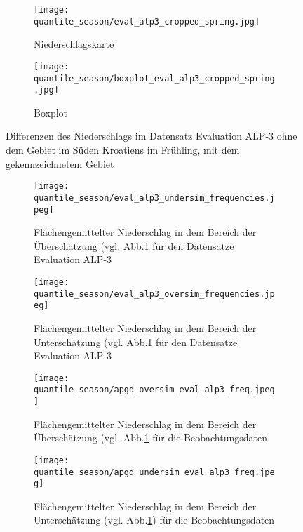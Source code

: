 \begin{figure}[h!]
	\begin{subfigure}{0.49\textwidth}
		\texttt{[image: quantile\_season/eval\_alp3\_cropped\_spring.jpg]}
		\caption{Niederschlagskarte}
		\label{fig:seasons:cropped eval_alp_3}
	\end{subfigure}
	\begin{subfigure}{0.49\textwidth}
		\texttt{[image: quantile\_season/boxplot\_eval\_alp3\_cropped\_spring.jpg]}
		\caption{Boxplot}
		\label{fig:seasons:cropped eval_alp_3_boxplot}
	\end{subfigure}
	\caption{Differenzen des Niederschlags im Datensatz Evaluation ALP-3 ohne dem Gebiet im Süden Kroatiens im Frühling, mit dem gekennzeichnetem Gebiet}
\end{figure}

\begin{figure}[h!]
	\begin{subfigure}{0.49\textwidth}
		\texttt{[image: quantile\_season/eval\_alp3\_undersim\_frequencies.jpeg]}
		\caption{Flächengemittelter Niederschlag in dem Bereich der Überschätzung (vgl. Abb.\ref{fig:seasons:cropped eval_alp_3} für den Datensatze Evaluation ALP-3}
		\label{fig:seasons:oversim eval_alp_3}
	\end{subfigure}
	\begin{subfigure}{0.49\textwidth}
		\texttt{[image: quantile\_season/eval\_alp3\_oversim\_frequencies.jpeg]}
		\caption{Flächengemittelter Niederschlag in dem Bereich der Unterschätzung (vgl. Abb.\ref{fig:seasons:cropped eval_alp_3} für den Datensatze Evaluation ALP-3}
		\label{fig:seasons:undersim_eval_alp_3}
	\end{subfigure}
	\caption{}
	\label{fig:seasons:overunder_eval_alp3}
\end{figure}
\begin{figure}[h!]
	\begin{subfigure}{0.49\textwidth}
		\texttt{[image: quantile\_season/apgd\_oversim\_eval\_alp3\_freq.jpeg]}
		\caption{Flächengemittelter Niederschlag in dem Bereich der Überschätzung (vgl. Abb.\ref{fig:seasons:cropped eval_alp_3} für die Beobachtungsdaten}
		\label{fig:seasons:oversim eval_alp_3_obs}
	\end{subfigure}
	\begin{subfigure}{0.49\textwidth}
		\texttt{[image: quantile\_season/apgd\_undersim\_eval\_alp3\_freq.jpeg]}
		\caption{Flächengemittelter Niederschlag in dem Bereich der Unterschätzung (vgl. Abb.\ref{fig:seasons:cropped eval_alp_3}) für die Beobachtungsdaten}
		\label{fig:seasons:undersim_eval_alp_3_obs}
	\end{subfigure}
	\caption{}
	\label{fig:seasons:overunder_obs_eval_alp3}
\end{figure}

